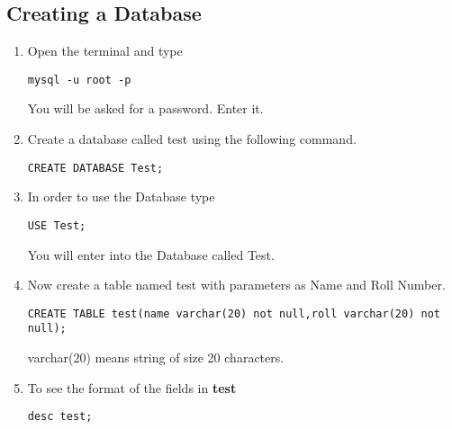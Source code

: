 \documentclass[journal,12pt,twocolumn]{IEEEtran}
\begin{document}
\subsection{Creating a Database}
\begin{enumerate}
\item 
Open the terminal and type
\begin{lstlisting}
mysql -u root -p
\end{lstlisting}
You will be asked for a password. Enter it.   
\item Create a database called test using the following command.
\begin{lstlisting}
CREATE DATABASE Test;
\end{lstlisting}
\item In order to use the Database type
\begin{lstlisting}
USE Test;
\end{lstlisting}
You will enter into the Database called Test.
\item Now create a table named test with parameters as Name and Roll Number.
\begin{lstlisting}
CREATE TABLE test(name varchar(20) not null,roll varchar(20) not null);
\end{lstlisting}
varchar(20) means string of size 20 characters.
%
\item To see the format of the fields in \textbf{test}
\begin{lstlisting}
desc test;
\end{lstlisting}
\end{enumerate}
\end{document}
